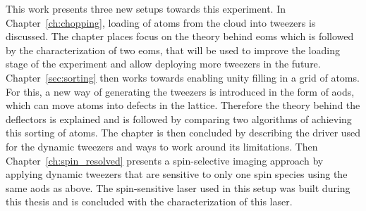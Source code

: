 This work presents three new setups towards this experiment. In Chapter~\ref{ch:chopping}, loading of atoms from the cloud into tweezers is discussed. The chapter places focus on the theory behind \acp{eom} which is followed by the characterization of two \acp{eom}, that will be used to improve the loading stage of the experiment and allow deploying more tweezers in the future.
Chapter~\ref{sec:sorting} then works towards enabling unity filling in a grid of atoms. For this, a new way of generating the tweezers is introduced in the form of \acp{aod}, which can move atoms into defects in the lattice. Therefore the theory behind the deflectors is explained and is followed by comparing two algorithms of achieving this sorting of atoms. The chapter is then concluded by describing the driver used for the dynamic tweezers and ways to work around its limitations.
Then Chapter~\ref{ch:spin_resolved} presents a spin-selective imaging approach by applying dynamic tweezers that are sensitive to only one spin species using the same \acp{aod} as above. The spin-sensitive laser used in this setup was built during this thesis and is concluded with the characterization of this laser.
